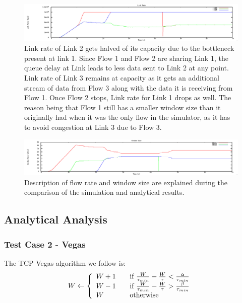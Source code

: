 \documentclass[12pt]{article}
\begin{document}
\begin{figure}[!ht]
\centering \includegraphics[bb= 0 0 1300 250, scale=.35]{figures/Test2_Vegas/link_rate.png}
\caption{Link rate of Link 2 gets halved of its capacity due to the bottleneck present at link 1. Since Flow 1 and Flow 2 are sharing Link 1, the queue delay at Link leads to less data sent to Link 2 at any point. Link rate of Link 3 remains at capacity as it gets an additional stream of data from Flow 3 along with the data it is receiving from Flow 1. Once Flow 2 stops, Link rate for Link 1 drops as well. The reason being that Flow 1 still has a smaller window size than it originally had when it was the only flow in the simulator, as it has to avoid congestion at Link 3 due to Flow 3. }
\label{fig:test2_vegas_link_rate}
\end{figure}

\begin{figure}[!ht]
\centering \includegraphics[bb= 0 0 1300 250, scale=.35]{figures/Test2_Vegas/window_size.png}
\caption{Description of flow rate and window size are explained during the comparison of the simulation and analytical results. }
\label{fig:test2_vegas_window_size}
\end{figure}

\newpage

\subsection{Analytical Analysis}
\subsubsection{Test Case 2 - Vegas}


The TCP Vegas algorithm we follow is:
\[ W \leftarrow \left\{
  \begin{array}{l l}
    W+1 & \quad \text{if }\frac{W}{\tau_{min}} - \frac{W}{\tau} < \frac{\alpha}{\tau_{min}}\\
    W-1 & \quad \text{if }\frac{W}{\tau_{min}} - \frac{W}{\tau} > \frac{\beta}{\tau_{min}}\\
    W & \quad \text{otherwise}\\
  \end{array} \right.\]
\end{document}
